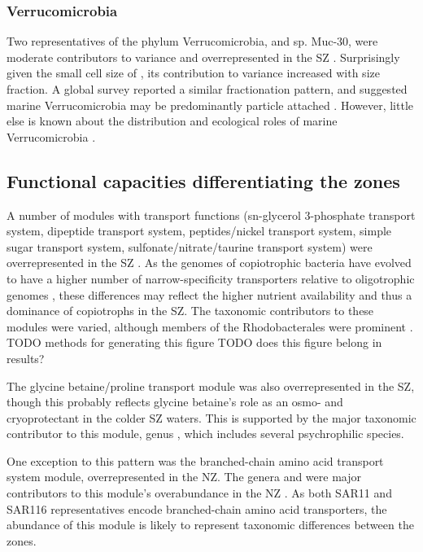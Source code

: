 \subsubsection{Verrucomicrobia}

Two representatives of the phylum Verrucomicrobia,  and  sp. Muc-30, were moderate contributors to variance and overrepresented in the \ac{SZ} .
Surprisingly given the small cell size of  \cite{Yoon:2007ic}, its contribution to variance increased with size fraction.
A global survey reported a similar fractionation pattern, and suggested marine Verrucomicrobia may be predominantly particle attached \cite{Freitas:2012jz}.
However, little else is known about the distribution and ecological roles of marine Verrucomicrobia \cite{Freitas:2012jz}.

\subsection{Functional capacities differentiating the zones}

A number of modules with transport functions (sn-glycerol 3-phosphate transport system, dipeptide transport system, peptides/nickel transport system, simple sugar transport system, sulfonate/nitrate/taurine transport system) were overrepresented in the \ac{SZ} .
As the genomes of copiotrophic bacteria have evolved to have a higher number of narrow-specificity transporters relative to oligotrophic genomes \cite{Lauro:2009gx}, these differences may reflect the higher nutrient availability and thus a dominance of copiotrophs in the \ac{SZ}.
The taxonomic contributors to these modules were varied, although members of the Rhodobacterales were prominent .
TODO methods for generating this figure
TODO does this figure belong in results?

The glycine betaine/proline transport module was also overrepresented in the \ac{SZ}, though this probably reflects glycine betaine's role as an osmo- and cryoprotectant in the colder \ac{SZ} waters.
This is supported by the major taxonomic contributor to this module, genus , which includes several psychrophilic species. 

One exception to this pattern was the branched-chain amino acid transport system module, overrepresented in the \ac{NZ}. 
The genera  and  were major contributors to this module's overabundance in the \ac{NZ} .
As both SAR11 \cite{Giovannoni:2005ib} and SAR116 \cite{Grote:2011dm} representatives encode branched-chain amino acid transporters, the abundance of this module is likely to represent taxonomic differences between the zones.

